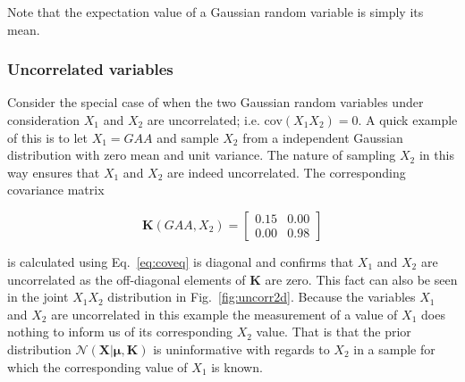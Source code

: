 \noindent Note that the expectation value of a Gaussian random variable is simply
its mean. \\

\subsubsection{Uncorrelated variables}
Consider the special case of when the two Gaussian random variables under
consideration $X_1$ and $X_2$ are uncorrelated; i.e. cov$(X_1X_2)=0$. A quick
example of this is to let $X_1=GAA$ and sample $X_2$ from a independent Gaussian
distribution with zero mean and unit variance.
The nature of sampling $X_2$ in this way ensures
that $X_1$ and $X_2$ are indeed uncorrelated. The corresponding covariance matrix

\begin{equation}
  \mathbf{K}(GAA,X_2) =
  \begin{bmatrix}
    0.15 & 0.00 \\
    0.00 & 0.98
  \end{bmatrix}
  \label{eq:Kuncorr}
\end{equation}

\noindent is calculated using Eq.~\ref{eq:coveq} is diagonal and confirms that
$X_1$ and $X_2$ are uncorrelated as the off-diagonal elements of $\mathbf{K}$ are zero.
This fact can also be seen in the joint $X_1X_2$ distribution in Fig.~\ref{fig:uncorr2d}.
Because the variables $X_1$ and $X_2$ are uncorrelated in this example the
measurement of a value of $X_1$ does nothing to inform us of its corresponding
$X_2$ value. That is that the prior distribution
$\mathcal{N}(\mathbf{X}|\boldsymbol{\mu},\mathbf{K})$ is uninformative with regards to
$X_2$ in a sample for which the corresponding value of $X_1$ is known. \\


